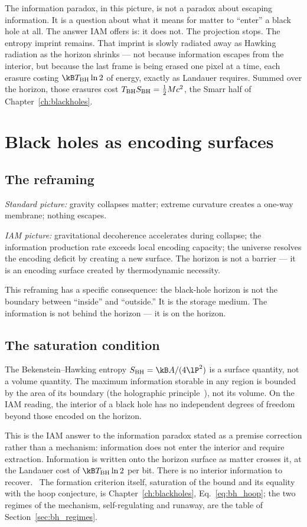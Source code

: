 The information paradox, in this picture, is not a paradox about escaping information. It is a question about what it means for matter to ``enter'' a black
hole at all. The answer IAM offers is: it does not. The projection stops. The entropy imprint remains. That imprint is slowly radiated away as Hawking
radiation as the horizon shrinks --- not because information escapes from the interior, but because the last frame is being erased one pixel at a time, each
erasure costing $\kB T_{\rm BH}\ln2$ of energy, exactly as Landauer requires. Summed over the horizon, those erasures cost $T_{\rm BH}S_{\rm BH}=\tfrac12Mc^2$, the Smarr
half of Chapter~\ref{ch:blackholes}. \interp

\section{Black holes as encoding surfaces}\label{sec:bi_surfaces}
\subsection{The reframing}
\emph{Standard picture:} gravity collapses matter; extreme curvature creates a one-way membrane; nothing escapes.

\emph{IAM picture:} gravitational decoherence accelerates during collapse; the information production rate exceeds local encoding capacity; the universe
resolves the encoding deficit by creating a new surface. The horizon is not a barrier --- it is an encoding surface created by thermodynamic necessity.
\conjecture

This reframing has a specific consequence: the black-hole horizon is not the boundary between ``inside'' and ``outside.'' It is the storage medium. The
information is not behind the horizon --- it is on the horizon.

\subsection{The saturation condition}
The Bekenstein--Hawking entropy $S_{\rm BH}=\kB A/(4\lP^2)$ is a surface quantity, not a volume quantity. The maximum information storable in any region is bounded
by the area of its boundary (the holographic principle~\cite{tHooft1993,Susskind1995}), not its volume. On the IAM reading, the interior of a black hole has no
independent degrees of freedom beyond those encoded on the horizon.

This is the IAM answer to the information paradox stated as a premise correction rather than a mechanism: information does not enter the interior and
require extraction. Information is written onto the horizon surface as matter crosses it, at the Landauer cost of $\kB T_{\rm BH}\ln2$ per bit. There is no
interior information to recover. \conjecture\ The formation criterion itself, saturation of the bound and its equality with the hoop conjecture, is
Chapter~\ref{ch:blackholes}, Eq.~\eqref{eq:bh_hoop}; the two regimes of the mechanism, self-regulating and runaway, are the table of
Section~\ref{sec:bh_regimes}.

